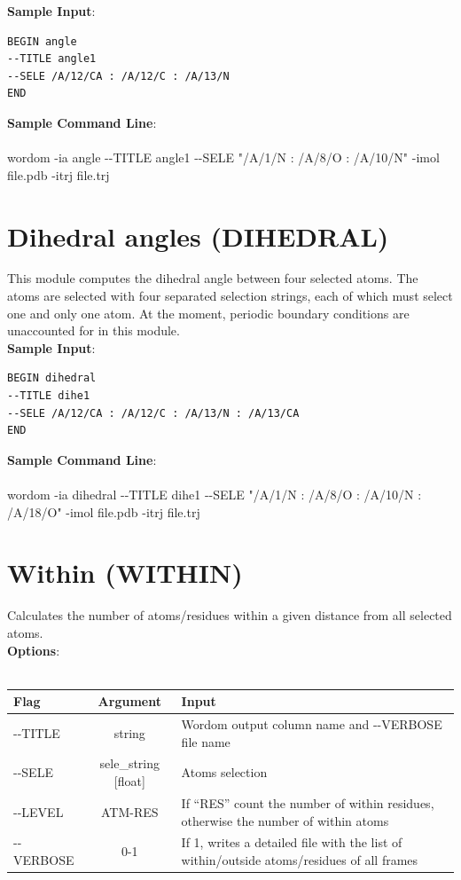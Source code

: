 \documentclass[11pt,twoside,onecolumn,a4paper,openright,notitlepage]{book}[2001/04/21]
\begin{document}
\textbf{\large Sample Input}:
\begin{verbatim}
BEGIN angle
--TITLE angle1
--SELE /A/12/CA : /A/12/C : /A/13/N 
END
\end{verbatim}

\textbf{\large Sample Command Line}:\\\\
\textsf{\large wordom -ia angle -{}-TITLE angle1 -{}-SELE "/A/1/N : /A/8/O : /A/10/N" -imol file.pdb -itrj file.trj}

\clearpage{}


\section{Dihedral angles (DIHEDRAL)}
This module computes the dihedral angle between four selected atoms. The atoms are selected with four separated selection strings, each of which must select one and only one atom. At the moment, periodic boundary conditions are unaccounted for in this module.\\

\textbf{\large Sample Input}:
\begin{verbatim}
BEGIN dihedral
--TITLE dihe1
--SELE /A/12/CA : /A/12/C : /A/13/N : /A/13/CA
END
\end{verbatim}

\textbf{\large Sample Command Line}:\\\\
\textsf{\large wordom -ia dihedral -{}-TITLE dihe1 -{}-SELE "/A/1/N : /A/8/O : /A/10/N : /A/18/O" -imol file.pdb -itrj file.trj}

\clearpage{}

\section{Within (WITHIN)}
Calculates the number of atoms/residues within a given distance from all selected atoms.\\

\textbf{\large Options}:\\\\
\begin{tabular}{l|c|p{7.0cm}}
Flag & Argument & Input \\
\hline
-{}-TITLE   & string                              & Wordom output column name and -{}-VERBOSE file name\\
-{}-SELE    & sele\_string [float]                & Atoms selection\\
-{}-LEVEL   & ATM-RES                             & If ``RES'' count the number of within residues, otherwise the number of within atoms\\
-{}-VERBOSE & 0-1                                 & If 1, writes a detailed file with the list of within/outside atoms/residues of all frames
\end{tabular}\\\\
\end{document}
